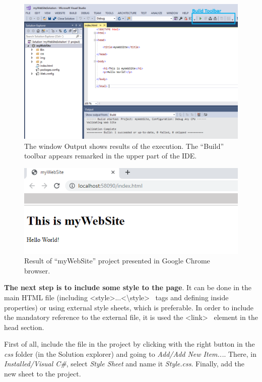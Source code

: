 \begin{figure}
    \centering
    \includegraphics[width= 0.9 \textwidth]{Figures/Projects/pro7}
    \caption{The window Output shows results of the execution. The ``Build'' toolbar appears remarked in the upper part of the IDE.}
    \label{fig:pro7}
\end{figure}

\begin{figure}
    \centering
    \includegraphics[width= 0.9 \textwidth]{Figures/Projects/pro8}
    \caption{Result of ``myWebSite'' project presented in Google Chrome browser.}
    \label{fig:pro8}
\end{figure}

\FloatBarrier
\textbf{The next step is to include some style to the page}. It can be done in the main HTML file (including \textless style\textgreater...\textless\textbackslash style\textgreater ~ tags and defining inside properties) or using external style sheets, which is preferable. In order to include the mandatory reference to the external file, it is used the \textless link\textgreater ~  element in the head section.

First of all, include the file in the project by clicking with the right button in the \textit{css} folder (in the Solution explorer) and going to \textit{Add/Add New Item...}. There, in \textit{Installed/Visual C\#}, select \textit{Style Sheet} and name it \textit{Style.css}. Finally, add the new sheet to the project. 

